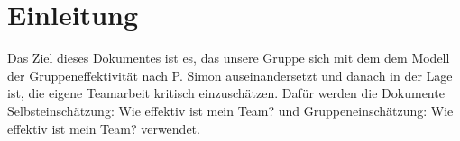 
\chapter{Einleitung}

Das Ziel dieses Dokumentes ist es, das unsere Gruppe sich mit dem dem Modell der Gruppeneffektivität nach
P. Simon auseinandersetzt und danach in der Lage ist, die eigene Teamarbeit kritisch einzuschätzen. Dafür
werden die Dokumente Selbsteinschätzung: Wie effektiv ist mein Team? und Gruppeneinschätzung: Wie effektiv ist mein Team? verwendet. 


\begin{comment}
Das Ziel dieses Dokuments ist es, die im HSR-Modul Teamkommunikation f"ur Ingenieure erlernten
Teamrollen-Modelle\cite{belbin1981management} anwenden zu k"onnen und diese den Teammitgliedern zuzuordnen. So sollen potenzielle
St"arken und Schw"achen des Teams entdeckt und Konsequenzen, welche zu einer besseren Teameffektivität f"uhren, eingeleitet werden.
\end{comment}